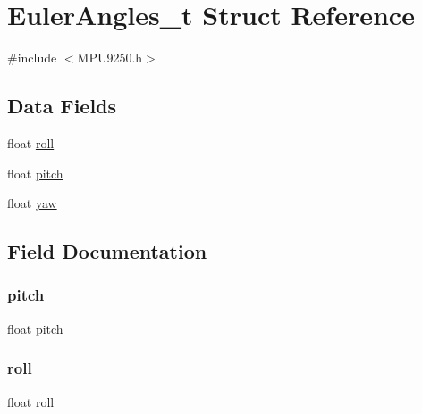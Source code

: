 \hypertarget{struct_euler_angles__t}{}\section{Euler\+Angles\+\_\+t Struct Reference}
\label{struct_euler_angles__t}


{\ttfamily \#include $<$M\+P\+U9250.\+h$>$}

\subsection*{Data Fields}
\begin{DoxyCompactItemize}
\item 
float \mbox{\hyperlink{struct_euler_angles__t_a26fd84d522945b6038221d9e38c7cc39}{roll}}
\item 
float \mbox{\hyperlink{struct_euler_angles__t_a282e7d4378d4a18a805b8980295ac86c}{pitch}}
\item 
float \mbox{\hyperlink{struct_euler_angles__t_a7efc219781df4a1e281cb5d348b7fbf9}{yaw}}
\end{DoxyCompactItemize}


\subsection{Field Documentation}
\mbox{\label{struct_euler_angles__t_a282e7d4378d4a18a805b8980295ac86c}} 
\subsubsection{\texorpdfstring{pitch}{pitch}}
{\footnotesize\ttfamily float pitch}

\mbox{\label{struct_euler_angles__t_a26fd84d522945b6038221d9e38c7cc39}} 
\subsubsection{\texorpdfstring{roll}{roll}}
{\footnotesize\ttfamily float roll}

\mbox{\label{struct_euler_angles__t_a7efc219781df4a1e281cb5d348b7fbf9}} 
